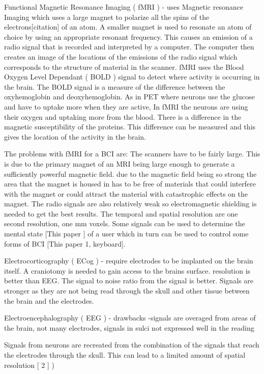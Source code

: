 Functional Magnetic Resonance Imaging\cite{} ( fMRI ) - uses Magnetic resonance Imaging\cite{} which uses a large
magnet to polarize all the spins of the electrons[citation] of an atom. A smaller magnet is used to resonate an 
atom of choice by using an appropriate resonant frequency. This causes an emission of a radio signal that is recorded 
and interpreted by a computer. The computer then creates an image of the locations of the emissions of the radio signal 
which corresponds to the structure of material in the scanner. fMRI uses the Blood Oxygen Level Dependant\cite{} ( BOLD ) 
signal to detect where activity is occurring in the brain. The BOLD signal  is a measure of the difference between 
the oxyhemoglobin and deoxyhemoglobin. As in PET where neurons use the glucose and have to uptake more when they are 
active, In fMRI the neurons are using their oxygen and uptaking more from the blood. There is a difference in the 
magnetic susceptibility of the proteins. This difference can be measured and this gives the location of the activity 
in the brain.

The problems with fMRI for a BCI are: The scanners have to be fairly large. This is due to the primary magnet of an MRI 
being large enough to generate a sufficiently powerful magnetic field. due to the magnetic field being so strong the 
area that the magnet is housed in has to be free of materials that could interfere with the magnet or could attract 
the material with catastrophic effects on the magnet. The radio signals are also relatively weak so electromagnetic 
shielding is needed to get the best results. The temporal and spatial resolution are one second resolution, one mm 
voxels. Some signals can be used to determine the mental state \cite{}[This paper ] of a user which in turn can be used to 
control some forms of BCI [This paper 1, keyboard].

Electrocorticography\cite{} ( ECog ) - require electrodes to be implanted on the brain itself. A craniotomy is needed to 
gain access to the brains surface. resolution is better than EEG. The signal to noise ratio from the signal is better.
Signals are stronger as they are not being read through the skull and other tissue between the brain and the 
electrodes.

Electroencephalography\cite{} ( EEG ) - drawbacks -signals are overaged from areas of the brain, not many electrodes, 
signals in sulci not expressed well in the reading 

Signals from neurons are recreated from the combination of the signals that reach the electrodes through the skull. 
This can lead to a limited amount of spatial resolution \cite{}[ 2 ]  )

